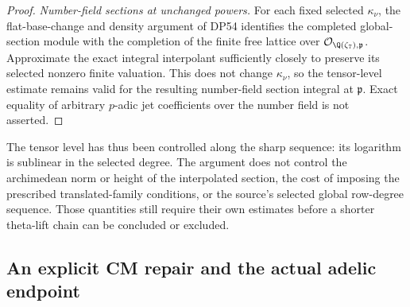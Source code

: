 \documentclass[11pt,a4paper]{article}
\theoremstyle{definition}\newtheorem{remark}[theorem]{Remark}
\begin{document}
\begin{proof}
\emph{Number-field sections at unchanged powers.}
For each fixed selected $\kappa_\nu$, the flat-base-change and density argument of DP54 identifies the completed global-section module with the completion of the finite free lattice over $\mathcal O_{\Q(\zeta_7),\mathfrak p}$.
Approximate the exact integral interpolant sufficiently closely to preserve its selected nonzero finite valuation.
This does not change $\kappa_\nu$, so the tensor-level estimate remains valid for the resulting number-field section integral at $\mathfrak p$.
Exact equality of arbitrary $p$-adic jet coefficients over the number field is not asserted.
\end{proof}

The tensor level has thus been controlled along the sharp sequence: its logarithm is sublinear in the selected degree. The argument does not control the archimedean norm or height of the interpolated section, the cost of imposing the prescribed translated-family conditions, or the source's selected global row-degree sequence. Those quantities still require their own estimates before a shorter theta-lift chain can be concluded or excluded.


\subsection{An explicit CM repair and the actual adelic endpoint}
\end{document}
